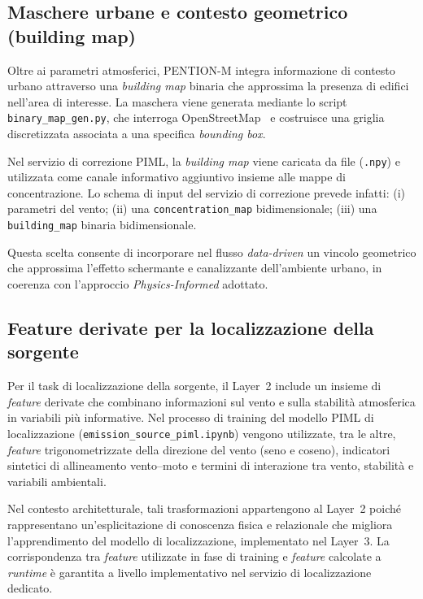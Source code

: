 \subsection{Maschere urbane e contesto geometrico (building map)}

Oltre ai parametri atmosferici, \textsc{PENTION-M} integra informazione di contesto urbano attraverso una \emph{building map} binaria che approssima la presenza di edifici nell’area di interesse.
La maschera viene generata mediante lo script \texttt{binary\_map\_gen.py}, che interroga OpenStreetMap~\cite{openstreetmap} e costruisce una griglia discretizzata associata a una specifica \textit{bounding box}.

Nel servizio di correzione PIML, la \textit{building map} viene caricata da file (\texttt{.npy}) e utilizzata come canale informativo aggiuntivo insieme alle mappe di concentrazione.
Lo schema di input del servizio di correzione prevede infatti:
(i) parametri del vento;
(ii) una \texttt{concentration\_map} bidimensionale;
(iii) una \texttt{building\_map} binaria bidimensionale.

Questa scelta consente di incorporare nel flusso \textit{data-driven} un vincolo geometrico che approssima l’effetto schermante e canalizzante dell’ambiente urbano, in coerenza con l’approccio \emph{Physics-Informed} adottato.

\subsection{Feature derivate per la localizzazione della sorgente}

Per il task di localizzazione della sorgente, il Layer~2 include un insieme di \textit{feature} derivate che combinano informazioni sul vento e sulla stabilità atmosferica in variabili più informative.
Nel processo di training del modello PIML di localizzazione (\texttt{emission\_source\_piml.ipynb}) vengono utilizzate, tra le altre, \textit{feature} trigonometrizzate della direzione del vento (seno e coseno), indicatori sintetici di allineamento vento--moto e termini di interazione tra vento, stabilità e variabili ambientali.

Nel contesto architetturale, tali trasformazioni appartengono al Layer~2 poiché rappresentano un’esplicitazione di conoscenza fisica e relazionale che migliora l’apprendimento del modello di localizzazione, implementato nel Layer~3.
La corrispondenza tra \textit{feature} utilizzate in fase di training e \textit{feature} calcolate a \textit{runtime} è garantita a livello implementativo nel servizio di localizzazione dedicato.

